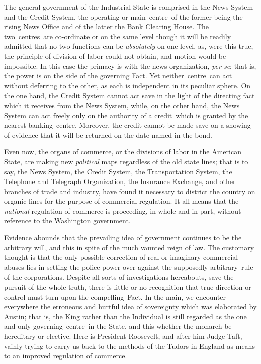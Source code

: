 \documentclass[openany,nobib]{tufte-book}
\begin{document}
The general government of the Industrial State is comprised in the News
System and the Credit System, the operating or main~centre~of the former
being the rising News Office and of the latter the Bank Clearing House.
The two~centres~are co-ordinate or on the same level though it will be
readily admitted that no two functions can be \emph{absolutely} on one
level, as, were this true, the principle of division of labor could not
obtain, and motion would be impossible. In this case the primacy is with
the news organization, \emph{per se}; that is, the power is on the side
of the governing Fact. Yet neither~centre~can act without deferring to
the other, as each is independent in its peculiar sphere. On the one
hand, the Credit System cannot act save in the light of the directing
fact which it receives from the News System, while, on the other hand,
the News System can act freely only on the authority of a credit~which
is granted by the nearest banking~centre. Moreover, the credit cannot be
made save on a showing of evidence that it will be returned on the date
named in the bond.~

Even now, the organs of commerce, or the divisions of labor in the
American State, are making new \emph{political} maps regardless of the
old state lines; that is to say, the News System, the Credit System, the
Transportation System, the Telephone and Telegraph Organization, the
Insurance Exchange, and other branches of trade and industry, have found
it necessary to district the country on organic lines for the purpose of
commercial regulation. It all means that the \emph{national} regulation
of commerce is proceeding, in whole and in part, without reference to
the Washington government.~

Evidence abounds that the prevailing idea of government continues to be
the arbitrary will, and this in spite of the much vaunted reign of law.
The customary thought is that the only possible correction of real or
imaginary commercial abuses lies in setting the police power over
against the supposedly arbitrary~rule of the corporations. Despite all
sorts of investigations hereabouts, save the pursuit of the whole truth,
there is little or no recognition that true direction or control must
turn upon the compelling~Fact. In the main, we encounter everywhere the
erroneous and hurtful idea of sovereignty which was elaborated by
Austin; that is, the King rather than the Individual is still regarded
as the one and only governing~centre~in the State, and this whether the
monarch be hereditary or elective. Here is President Roosevelt, and
after him Judge Taft, vainly trying to carry us back to the methods of
the Tudors in England as means to an improved regulation of commerce.~
\end{document}
